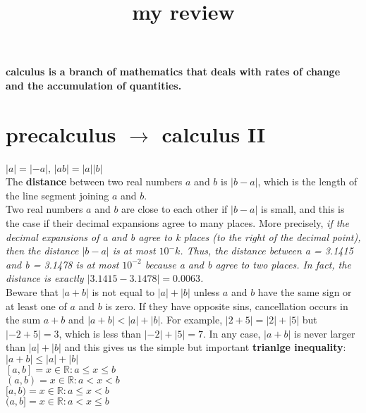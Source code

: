 \documentclass{article}
\begin{document}
\title{my review}
\maketitle

\textbf{calculus is a branch of mathematics that deals with rates of change and the accumulation of quantities.}

\section*{precalculus $\rightarrow$ calculus II}

$\lvert a\rvert = \lvert -a\rvert$, $\lvert ab\rvert = \lvert a\rvert\lvert b\rvert$\\

The \textbf{distance} between two real numbers $a$ and $b$ is $\lvert b - a \rvert$, which is the length of the line segment joining $a$ and $b$.\\
Two real numbers $a$ and $b$ are close to each other if $\lvert b - a\rvert$ is small, and this is the case if their decimal expansions agree to many places. More precisely, \textit{if the decimal expansions of a and b agree to k places (to the right of the decimal point), then the distance $\lvert b - a\rvert$ is at most $10^-k$. Thus, the distance between a = 3.1415 and b = 3.1478 is at most $10^{-2}$ because a and b agree to two places. In fact, the distance is exactly $\lvert3.1415 - 3.1478\rvert = 0.0063$.}\\

Beware that $\lvert a + b\rvert$ is not equal to $\lvert a\rvert + \lvert b\rvert$ unless $a$ and $b$ have the same sign or at least one of $a$ and $b$ is zero. If they have opposite sins, cancellation occurs in the sum $a + b$ and $\lvert a+b\rvert < \lvert a\rvert + \lvert b\rvert$. For example, $\lvert 2 + 5\rvert = \lvert2\rvert + \lvert5\rvert$ but $\lvert-2 + 5\rvert = 3$, which is less than $\lvert-2\rvert + \lvert5\rvert = 7$. In any case, $\lvert a + b\rvert$ is never larger than $\lvert a\rvert + \lvert b\rvert$ and this gives us the simple but important \textbf{trianlge inequality}: $\lvert a + b\rvert \leq \lvert a\rvert + \lvert b\rvert$\\

$[a, b] = {x \in \mathbb{R} : a \leq x \leq b}$\\
$(a, b) = {x \in \mathbb{R} : a < x < b}$\\
$[a, b) = {x \in \mathbb{R} : a \leq x < b}$\\
$(a, b] = {x \in \mathbb{R} : a < x \leq b}$\\
\end{document}
